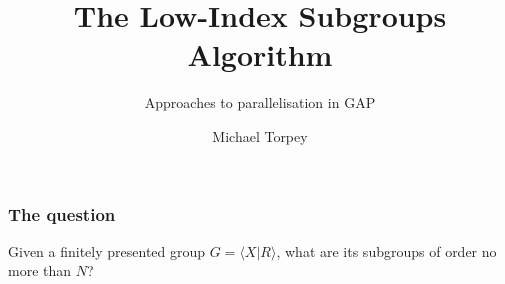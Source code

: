 \documentclass{beamer}
\title{The Low-Index Subgroups Algorithm}
\subtitle{Approaches to parallelisation in GAP}
\author{Michael Torpey}
\begin{document}
\maketitle
\begin{frame}
  \frametitle{The question}
  Given a finitely presented group $G = \langle X | R \rangle$, what are its subgroups of order no more than $N$?
\end{frame}
\end{document}

